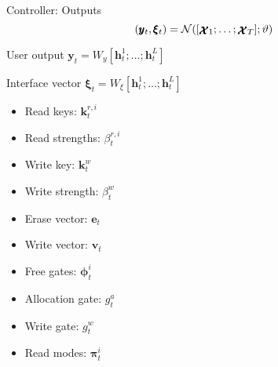\documentclass{beamer}
\newcommand{\xx}{\pmb{\raisebox{-1.5pt}{$\mathcal{X}$}}}
\newcommand{\hh}{\pmb{h}}
\begin{document}
\begin{frame}{Controller: Outputs}
	\[
	(\pmb{y}_t,\pmb{\xi}_t)=\mathcal{N}([\xx_1;\dots;\xx_T];\vartheta)
	\]
	\vspace{5pt}
	
	\pause
	\alert{User output} $\pmb{y}_t = W_y[\hh_t^1;\dots;\hh_t^L]$
	
	\pause
	\alert{Interface vector} $\pmb{\xi}_t = W_\xi[\hh_t^1;\dots;\hh_t^L]$
	
	\begin{minipage}{0.49\textwidth}
	\begin{itemize}
		\item Read keys: $\pmb{k}_t^{r,i}$ %
		\item Read strengths: $\beta_t^{r,i}$ %
		\item Write key: $\pmb{k}_t^w$ %
		\item Write strength: $\beta_t^{w}$ %
		\item Erase vector: $\pmb{e}_t$ %
	\end{itemize}
	\end{minipage}
	\begin{minipage}{0.49\textwidth}
	\begin{itemize}
		\item Write vector: $\pmb{v}_t$ %
		\item Free gates: $\pmb{\phi}_t^i$ %
		\item Allocation gate: $g_t^a$ %
		\item Write gate: $g_t^w$ %
		\item Read modes: $\pmb{\pi}_t^i$ %
	\end{itemize}
	\end{minipage}
\end{frame}
\end{document}
